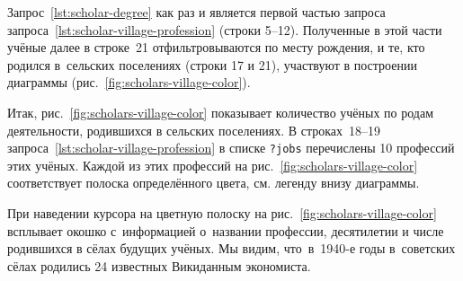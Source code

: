 Запрос~\ref{lst:scholar-degree} как раз и является 
первой частью запроса запроса~\ref{lst:scholar-village-profession} (строки 5--12). 
Полученные в этой части учёные далее в строке~21 
отфильтровываются по месту рождения, и те, кто родился в~сельских поселениях (строки 17 и 21), 
участвуют в построении диаграммы (рис.~\ref{fig:scholars-village-color}).


Итак, рис.~\ref{fig:scholars-village-color} показывает количество учёных по родам деятельности, 
родившихся в сельских поселениях. 
В строках~18--19 запроса~\ref{lst:scholar-village-profession} 
в списке \lstinline|?jobs| перечислены 10 профессий этих учёных. 
%
% 
%
Каждой из этих профессий на рис.~\ref{fig:scholars-village-color} 
соответствует полоска определённого цвета, см. легенду внизу диаграммы. 

При наведении курсора на цветную полоску на рис.~\ref{fig:scholars-village-color} 
всплывает окошко с~информацией о~названии профессии, десятилетии и числе родившихся в сёлах будущих учёных. 
Мы видим, что~в~1940-е годы в~советских сёлах родились 24 известных Викиданным экономиста.%

